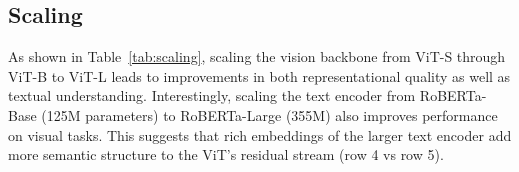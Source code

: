 \subsection{Scaling}
\label{subsec:scaling}


As shown in Table~\ref{tab:scaling}, scaling the vision backbone from ViT-S through ViT-B to ViT-L leads to improvements in both representational quality as well as textual understanding. 
Interestingly, scaling the text encoder from RoBERTa-Base (125M parameters) to  RoBERTa-Large (355M) also improves performance on visual tasks. 
This suggests that rich embeddings of the larger text encoder add more semantic structure to the ViT's residual stream (row 4 vs row 5).


